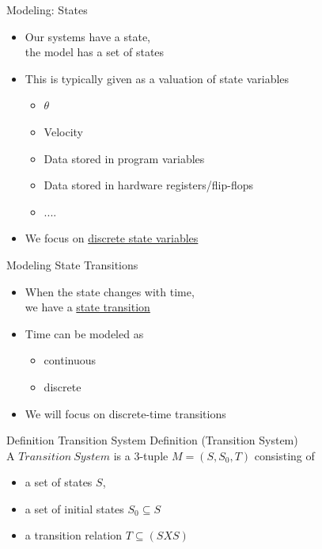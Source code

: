 \documentclass{beamer}
\begin{document}
\begin{frame}{Modeling: States}
\begin{itemize}
\item<1-> Our systems have a state, \\
the model has a set of states

\item<2-> This is typically given as a valuation of state variables
\begin{itemize}
\item $\theta$
\item Velocity
\item Data stored in program variables
\item Data stored in hardware registers/flip-flops
\item ....
\end{itemize}

\item<3-> We focus on \underline{discrete state variables}
\end{itemize}
\end{frame}

\begin{frame}{Modeling State Transitions}
\begin{itemize}
\item<1-> When the state changes with time, \\
we have a \underline{state transition}

\item<2-> Time can be modeled as
 \begin{itemize}
\item continuous
\item discrete
\end{itemize}

\item<3-> We will focus on discrete-time transitions
\end{itemize}
\end{frame}

\begin{frame}{Definition Transition System}
Definition (Transition System) \\
A $Transition~System$ is a 3-tuple $M = (S, S_0, T)$ consisting of
\begin{itemize}
\item a set of states $S$,

\item a set of initial states $S_0 \subseteq S$\item a transition relation $T \subseteq (S X S)$
\end{itemize}
\end{frame}
\end{document}
